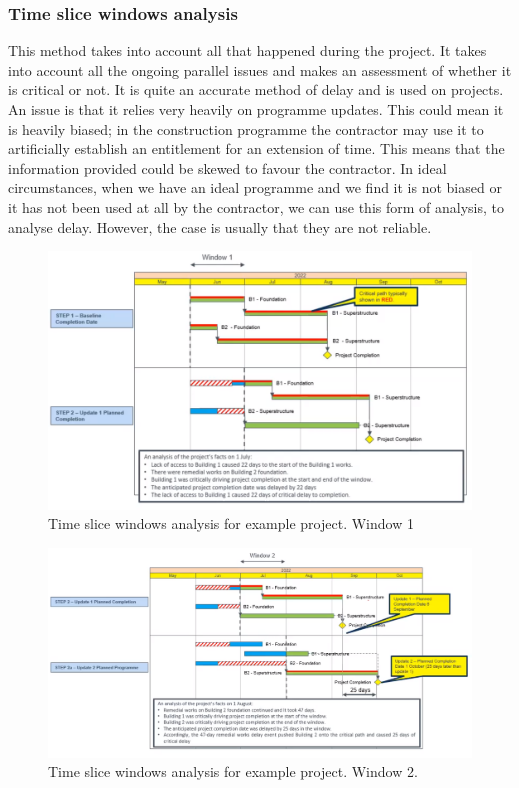 \subsubsection{Time slice windows analysis}
This method takes into account all that happened during the project. It takes into account all the ongoing parallel issues and makes an assessment of whether it is critical or not. It is quite an accurate method of delay and is used on projects. An issue is that it relies very heavily on programme updates. This could mean it is heavily biased; in the construction programme the contractor may use it to artificially establish an entitlement for an extension of time. This means that the information provided could be skewed to favour the contractor. In ideal circumstances, when we have an ideal programme and we find it is not biased or it has not been used at all by the contractor, we can use this form of analysis, to analyse delay. However, the case is usually that they are not reliable.
\begin{figure}[H]
    \centering
    \includegraphics[width = \textwidth]{img/figure33.png}
    \caption{Time slice windows analysis for example project. Window 1}
\end{figure}
\begin{figure}[H]
    \centering
    \includegraphics[width = \textwidth]{img/figure34.png}
    \caption{Time slice windows analysis for example project. Window 2.}
\end{figure}
